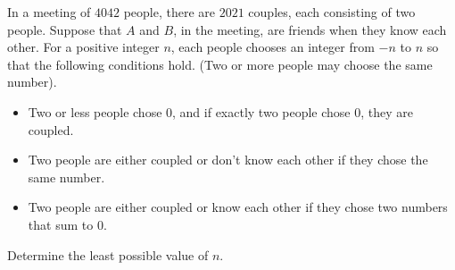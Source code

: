 In a meeting of $4042$ people, there are $2021$ couples, each consisting of two people. Suppose that $A$ and $B$, in the meeting, are friends when they know each other. For a positive integer $n$, each people chooses an integer from $-n$ to $n$ so that the following conditions hold. (Two or more people may choose the same number).
\begin{itemize}
	\item Two or less people chose $0$, and if exactly two people chose $0$, they are coupled.
	\item Two people are either coupled or don't know each other if they chose the same number.
	\item Two people are either coupled or know each other if they chose two numbers that sum to $0$.
\end{itemize}
Determine the least possible value of $n$.